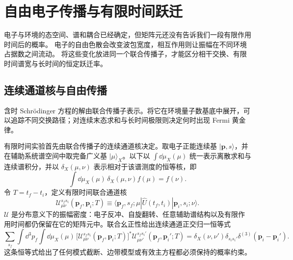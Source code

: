 \chapter{自由电子传播与有限时间跃迁}\label{chap:electron-finite-time}

电子与环境的态空间、谱和耦合已经确定，但矩阵元还没有告诉我们一段有限作用时间后的概率。
电子的自由色散会改变波包宽度，相互作用则让振幅在不同环境占据数之间流动。
将这些变化放进同一个联合传播子，才能区分相干交换、有限时间谱宽与长时间的恒定跃迁率。

\section{连续通道核与自由传播}

含时 Schr\"odinger 方程的解由联合传播子表示。将它在环境量子数基底中展开，可以追踪不同交换路径；对连续末态求和与长时间极限则决定何时出现 Fermi 黄金律。

有限时间实验首先由联合传播子的连续通道核决定。取电子正能连续基 $|\mathbf p,s\rangle$，并在辅助系统谱空间中取完备广义基 $|\mu\rangle_X$。以下以 $\int\dd\mu_X(\mu)$ 统一表示离散求和与连续谱积分，并以 $\delta_X(\mu,\nu)$ 表示相对于该谱测度的恒等核，即
\[
\int\dd\mu_X(\mu)\,\delta_X(\mu,\nu)f(\mu)=f(\nu).
\]
令 $T=t_f-t_i$，定义有限时间联合通道核
\begin{equation}
\boxed{
\mathscr U_{\mu\nu}^{s_f s_i}
(\mathbf p_f,\mathbf p_i;T)
\equiv
\langle \mathbf p_f,s_f;\mu|
\hat U(t_f,t_i)
|\mathbf p_i,s_i;\nu\rangle .}
\label{eq:exact_finite_time_channel_kernel}
\end{equation}
$\mathscr U$ 是分布意义下的振幅密度：电子反冲、自旋翻转、任意辅助谱结构以及有限作用时间都仍保留在它的矩阵元中。联合幺正性给出连续通道正交归一恒等式
\begin{equation}
\boxed{
\sum_{s_f}\int\dd^3p_f\int\dd\mu_X(\mu)\,
\bigl[\mathscr U_{\mu\nu}^{s_f s_i}
(\mathbf p_f,\mathbf p_i;T)\bigr]^*
\mathscr U_{\mu\nu'}^{s_f s_i'}
(\mathbf p_f,\mathbf p_i';T)
=
\delta_X(\nu,\nu')\delta_{s_i s_i'}
\delta^{(3)}(\mathbf p_i-\mathbf p_i').}
\label{eq:exact_channel_kernel_unitarity}
\end{equation}
这条恒等式给出了任何模式截断、边带模型或有效主方程都必须保持的概率约束。

